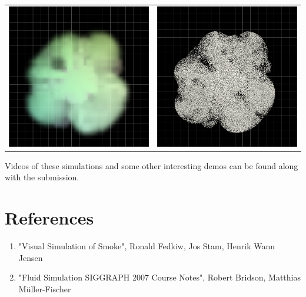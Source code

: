 \documentclass[a4paper,11pt]{article}
\theoremstyle{mytheor}
\begin{document}
\begin{table}[H]
\begin{tabular}{cc}
\newline
\includegraphics[width=70mm]{obs_d_5.png} &\includegraphics[width=70mm]{obs_p_5.png}\\
\end{tabular}
\end{table}


\par
\noindent
Videos of these simulations and some other interesting demos can be found along with the submission. 


\section*{References}
\begin{enumerate}
    \item "Visual Simulation of Smoke", Ronald Fedkiw, Jos Stam, Henrik Wann Jensen
    \item "Fluid Simulation SIGGRAPH 2007 Course Notes", Robert Bridson, Matthias Müller-Fischer
\end{enumerate}


\end{document}
